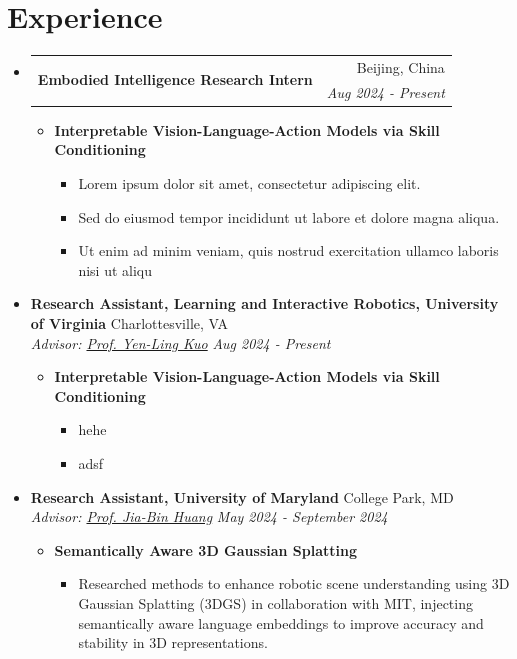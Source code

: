 \documentclass[letterpaper,11pt]{article}
\makeatletter
\newcommand{\Date}[1]{\textit{\small #1}}
\newcommand{\heading}[4]{
  \textbf{#1} \hfill #2 \\
  \textit{\small#3} \hfill \Date{#4}
}
\newcommand{\simpleheading}[3]{%
  \noindent
  \begin{tabular*}{\linewidth}{@{\extracolsep{\fill}} l r}
    \multirow{2}{*}[0pt]{\textbf{#1}} & #2 \\[-0.2ex]
                                      & \Date{#3}
  \end{tabular*}%
}
\makeatother
\begin{document}
\section{Experience}
\begin{itemize}[label={}, leftmargin=0pt]
    \item \simpleheading{Embodied Intelligence Research Intern}{Beijing, China}{Aug 2024 - Present}
          \begin{itemize}
              \item \textbf{Interpretable Vision-Language-Action Models via Skill Conditioning}
                    \begin{itemize}
                        \item Lorem ipsum dolor sit amet, consectetur adipiscing elit.
                        \item Sed do eiusmod tempor incididunt ut labore et dolore magna aliqua.
                        \item Ut enim ad minim veniam, quis nostrud exercitation ullamco laboris nisi ut aliqu
                    \end{itemize}
          \end{itemize}
    \item \heading{Research Assistant, Learning and Interactive Robotics, University of Virginia}{Charlottesville, VA}
          {Advisor: \href{https://yenlingkuo.com/}{Prof. Yen-Ling Kuo}}{Aug 2024 - Present}
          \begin{itemize}
              \item \textbf{Interpretable Vision-Language-Action Models via Skill Conditioning}
                    \begin{itemize}
                        \item hehe
                        \item adsf
                    \end{itemize}
          \end{itemize}
    \item \heading{Research Assistant, University of Maryland}{College Park, MD}
          {Advisor: \href{https://jbhuang0604.github.io/}{Prof. Jia-Bin Huang}}{May 2024 - September 2024}
          \begin{itemize}
              \item \textbf{Semantically Aware 3D Gaussian Splatting}
                    \begin{itemize}
                        \item Researched methods to enhance robotic scene understanding using 3D Gaussian Splatting (3DGS) in collaboration with MIT, injecting semantically aware language embeddings to improve accuracy and stability in 3D representations.

\end{itemize}
\end{itemize}
\end{itemize}
\end{document}
